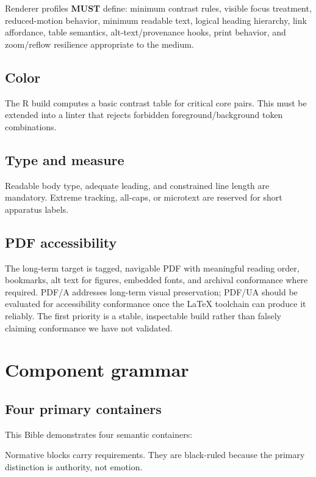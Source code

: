 \documentclass[11pt,twoside,openany]{report}
\newcommand{\MUST}{\textbf{MUST}\xspace}
\begin{document}
\begin{specbox}
Renderer profiles \MUST define: minimum contrast rules, visible focus treatment, reduced-motion behavior, minimum readable text, logical heading hierarchy, link affordance, table semantics, alt-text/provenance hooks, print behavior, and zoom/reflow resilience appropriate to the medium.
\end{specbox}

\section{Color}
The R build computes a basic contrast table for critical core pairs. This must be extended into a linter that rejects forbidden foreground/background token combinations.

\section{Type and measure}
Readable body type, adequate leading, and constrained line length are mandatory. Extreme tracking, all-caps, or microtext are reserved for short apparatus labels.

\section{PDF accessibility}
The long-term target is tagged, navigable PDF with meaningful reading order, bookmarks, alt text for figures, embedded fonts, and archival conformance where required. PDF/A addresses long-term visual preservation; PDF/UA should be evaluated for accessibility conformance once the LaTeX toolchain can produce it reliably. The first priority is a stable, inspectable build rather than falsely claiming conformance we have not validated.

\clearpage
\chapter{Component grammar}

\section{Four primary containers}
This Bible demonstrates four semantic containers:

\begin{specbox}
Normative blocks carry requirements. They are black-ruled because the primary distinction is authority, not emotion.
\end{specbox}
\end{document}
